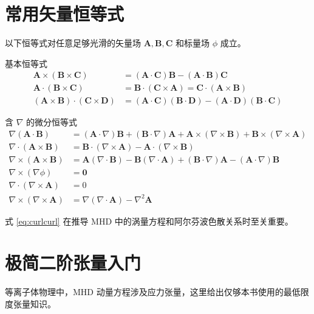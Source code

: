 \documentclass[12pt,a4paper,openany,oneside]{book}
\newcommand{\vect}[1]{\bm{#1}}
\newcommand{\grad}{\nabla}
\newcommand{\curl}{\nabla\times}
\newcommand{\divg}{\nabla\cdot}
\newcommand{\lap}{\nabla^2}
\begin{document}
\section{常用矢量恒等式}

以下恒等式对任意足够光滑的矢量场 $\vect{A},\vect{B},\vect{C}$ 和标量场 $\phi$ 成立。

\begin{theorem}{基本恒等式}{}{}
\begin{align}
\vect{A}\times(\vect{B}\times\vect{C}) &= (\vect{A}\cdot\vect{C})\vect{B} - (\vect{A}\cdot\vect{B})\vect{C} \label{eq:bac-cab} \\[6pt]
\vect{A}\cdot(\vect{B}\times\vect{C}) &= \vect{B}\cdot(\vect{C}\times\vect{A}) = \vect{C}\cdot(\vect{A}\times\vect{B}) \\[6pt]
(\vect{A}\times\vect{B})\cdot(\vect{C}\times\vect{D}) &= (\vect{A}\cdot\vect{C})(\vect{B}\cdot\vect{D}) - (\vect{A}\cdot\vect{D})(\vect{B}\cdot\vect{C})
\end{align}
\end{theorem}

\begin{theorem}{含 $\nabla$ 的微分恒等式}{}{}
\begin{align}
\grad(\vect{A}\cdot\vect{B}) &= (\vect{A}\cdot\grad)\vect{B} + (\vect{B}\cdot\grad)\vect{A} + \vect{A}\times(\curl\vect{B}) + \vect{B}\times(\curl\vect{A}) \\[6pt]
\divg(\vect{A}\times\vect{B}) &= \vect{B}\cdot(\curl\vect{A}) - \vect{A}\cdot(\curl\vect{B}) \\[6pt]
\curl(\vect{A}\times\vect{B}) &= \vect{A}(\divg\vect{B}) - \vect{B}(\divg\vect{A}) + (\vect{B}\cdot\grad)\vect{A} - (\vect{A}\cdot\grad)\vect{B} \\[6pt]
\curl(\grad\phi) &= \vect{0} \\[6pt]
\divg(\curl\vect{A}) &= 0 \\[6pt]
\curl(\curl\vect{A}) &= \grad(\divg\vect{A}) - \lap\vect{A} \label{eq:curlcurl}
\end{align}
\end{theorem}

式 \eqref{eq:curlcurl} 在推导 MHD 中的涡量方程和阿尔芬波色散关系时至关重要。


\section{极简二阶张量入门}

等离子体物理中，MHD 动量方程涉及应力张量，这里给出仅够本书使用的最低限度张量知识。
\end{document}
